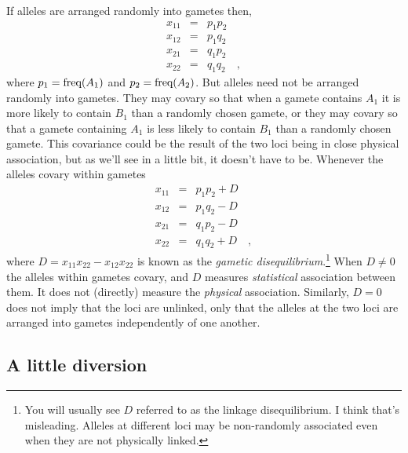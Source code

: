 \documentclass[12pt]{article}
\begin{document}
If alleles are arranged randomly into gametes then,
\begin{eqnarray*}
x_{11} &=& p_1p_2 \\
x_{12} &=& p_1q_2 \\
x_{21} &=& q_1p_2 \\
x_{22} &=& q_1q_2 \quad ,
\end{eqnarray*}
where $p_1 = \hbox{freq}(A_1)$ and $p_2 = \hbox{freq}(A_2)$. But
alleles need not be arranged randomly into gametes. They may covary so
that when a gamete contains $A_1$ it is more likely to contain $B_1$
than a randomly chosen gamete, or they may covary so that a gamete
containing $A_1$ is less likely to contain $B_1$ than a randomly
chosen gamete. This covariance could be the result of the two loci
being in close physical association, but as we'll see in a little bit,
it doesn't have to be. Whenever the alleles covary within gametes
\begin{eqnarray*}
x_{11} &=& p_1p_2 + D \\
x_{12} &=& p_1q_2 - D \\
x_{21} &=& q_1p_2 - D \\
x_{22} &=& q_1q_2 + D \quad ,
\end{eqnarray*}
where $D = x_{11}x_{22} - x_{12}x_{22}$ is known as the {\it gametic
  disequilibrium}.\footnote{You will usually see $D$ referred to as
  the linkage disequilibrium. I think that's misleading. Alleles at
  different loci may be non-randomly associated even when they are not
  physically linked.} When $D \ne 0$ the alleles within gametes
covary, and $D$ measures {\it statistical\/} association between
them. It does not (directly) measure the {\it physical\/}
association. Similarly, $D = 0$ does not imply that the loci are
unlinked, only that the alleles at the two loci are arranged into
gametes independently of one another.

\subsection*{A little diversion}
\end{document}
